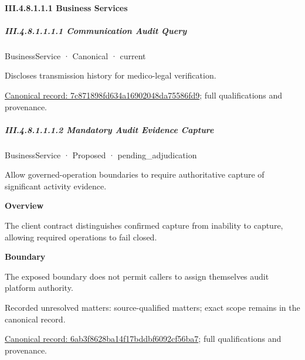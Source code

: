 \paragraph*{III.4.8.1.1.1 Business Services}
\label{navigation:III.4.8.1.1.1}

\subparagraph*{III.4.8.1.1.1.1 Communication Audit Query}
\label{navigation:III.4.8.1.1.1.1}

\label{element:7c871898fd634a16902048da75586fd9}
{\small BusinessService · Canonical · current}\par

Discloses transmission history for medico-legal verification.


{\footnotesize \href{../../../../../../../../continuum/business/business-service/7c871898fd634a16902048da75586fd9.md}{Canonical record: 7c871898fd634a16902048da75586fd9}; full qualifications and provenance.}\par
\subparagraph*{III.4.8.1.1.1.2 Mandatory Audit Evidence Capture}
\label{navigation:III.4.8.1.1.1.2}

\label{element:6ab3f8628ba14f17bddbf6092cf56ba7}
{\small BusinessService · Proposed · pending\_adjudication}\par

Allow governed-operation boundaries to require authoritative capture of significant activity evidence.



\textbf{Overview}



The client contract distinguishes confirmed capture from inability to capture, allowing required operations to fail closed.



\textbf{Boundary}



The exposed boundary does not permit callers to assign themselves audit platform authority.


{\small Recorded unresolved matters: source-qualified matters; exact scope remains in the canonical record.}\par
{\footnotesize \href{../../../../../../../../continuum/business/business-service/6ab3f8628ba14f17bddbf6092cf56ba7.md}{Canonical record: 6ab3f8628ba14f17bddbf6092cf56ba7}; full qualifications and provenance.}\par
